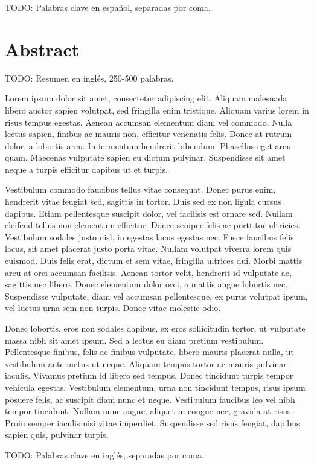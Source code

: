 \begin{keywordsEs}
	TODO: Palabras clave en español, separadas por coma.
\end{keywordsEs}


\chapter*{Abstract}

\begin{abstractEn}
TODO: Resumen en inglés, 250-500 palabras.

Lorem ipsum dolor sit amet, consectetur adipiscing elit. Aliquam malesuada libero auctor sapien volutpat, sed fringilla enim tristique. Aliquam varius lorem in risus tempus egestas. Aenean accumsan elementum diam vel commodo. Nulla lectus sapien, finibus ac mauris non, efficitur venenatis felis. Donec at rutrum dolor, a lobortis arcu. In fermentum hendrerit bibendum. Phasellus eget arcu quam. Maecenas vulputate sapien eu dictum pulvinar. Suspendisse sit amet neque a turpis efficitur dapibus ut et turpis.

Vestibulum commodo faucibus tellus vitae consequat. Donec purus enim, hendrerit vitae feugiat sed, sagittis in tortor. Duis sed ex non ligula cursus dapibus. Etiam pellentesque suscipit dolor, vel facilisis est ornare sed. Nullam eleifend tellus non elementum efficitur. Donec semper felis ac porttitor ultricies. Vestibulum sodales justo nisl, in egestas lacus egestas nec. Fusce faucibus felis lacus, sit amet placerat justo porta vitae. Nullam volutpat viverra lorem quis euismod. Duis felis erat, dictum et sem vitae, fringilla ultrices dui. Morbi mattis arcu at orci accumsan facilisis. Aenean tortor velit, hendrerit id vulputate ac, sagittis nec libero. Donec elementum dolor orci, a mattis augue lobortis nec. Suspendisse vulputate, diam vel accumsan pellentesque, ex purus volutpat ipsum, vel luctus urna sem non turpis. Donec vitae molestie odio.

Donec lobortis, eros non sodales dapibus, ex eros sollicitudin tortor, ut vulputate massa nibh sit amet ipsum. Sed a lectus eu diam pretium vestibulum. Pellentesque finibus, felis ac finibus vulputate, libero mauris placerat nulla, ut vestibulum ante metus ut neque. Aliquam tempus tortor ac mauris pulvinar iaculis. Vivamus pretium id libero sed tempus. Donec tincidunt turpis tempor vehicula egestas. Vestibulum elementum, urna non tincidunt tempus, risus ipsum posuere felis, ac suscipit diam nunc et neque. Vestibulum faucibus leo vel nibh tempor tincidunt. Nullam nunc augue, aliquet in congue nec, gravida at risus. Proin semper iaculis nisi vitae imperdiet. Suspendisse sed risus feugiat, dapibus sapien quis, pulvinar turpis.

\end{abstractEn}

\begin{keywordsEn}
TODO: Palabras clave en inglés, separadas por coma.
\end{keywordsEn}


